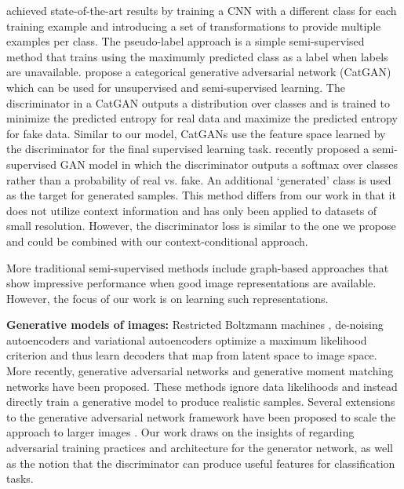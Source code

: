 \documentclass{article} %
\begin{document}
\cite{dosovitskiy2014b} achieved state-of-the-art results
by training a CNN with a different class for each training example and
introducing a set of transformations to provide multiple examples per
class.  The pseudo-label approach
\citep{lee2013} is a simple semi-supervised method that trains using
the maximumly predicted class as a label when labels are unavailable.
\cite{Springenberg2015} propose a categorical generative adversarial network (CatGAN) which can be used for unsupervised and semi-supervised learning. 
The discriminator in a CatGAN outputs a distribution over classes and is trained to minimize the predicted entropy for real data and maximize the predicted entropy for fake data. 
Similar to our model, CatGANs use the feature space learned by the discriminator for the final supervised learning task. 
\cite{Salimans2016} recently proposed a semi-supervised GAN model in which the discriminator outputs a softmax over classes rather than a probability of real vs. fake. 
An additional `generated' class is used as the target for generated samples. 
This method differs from our work in that it does not utilize context information and has only been applied to datasets of small resolution. 
However, the discriminator loss is similar to the one we propose and could be combined with our context-conditional approach.

More traditional semi-supervised methods include graph-based
approaches \citep{Zhuo04,Zhu06semi-supervisedlearning} that show
impressive performance when good image representations are
available. However, the focus of our work is on learning such
representations.

\textbf{Generative models of images:} Restricted Boltzmann machines \citep{salakhutdinov2015},
de-noising autoencoders \citep{vincent2008} and variational
autoencoders \citep{kingma2014a} optimize a maximum likelihood
criterion and thus learn decoders that map from latent space to image
space.  More recently, generative adversarial networks
\citep{goodfellow2014} and generative moment matching networks
\citep{li2015,karolina2015} have been proposed.  These methods ignore data likelihoods
and instead directly train a generative model to produce realistic
samples.  Several extensions to the generative adversarial network
framework have been proposed to scale the approach to larger images
\citep{denton2015,radford2016,Salimans2016}. Our
work draws on the insights of \cite{radford2016} regarding adversarial training practices
and architecture for the generator network, as well as the notion that
the discriminator can produce useful features for classification
tasks.
\end{document}
